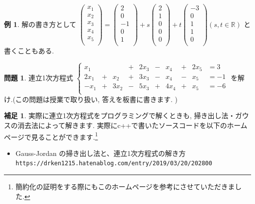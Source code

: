 \documentclass[dvipdfmx,a4paper,11pt]{article}
\newcommand{\R}{\mathbb{R}}
\theoremstyle{definition}
\newtheorem{exa}[thm]{例}
\newtheorem{rema}[thm]{補足}
\newtheorem{ques}[thm]{問題}
\begin{document}
\begin{exa}
解の書き方として
$
\begin{pmatrix}
x_1\\
x_2 \\
x_3 \\
x_4 \\
x_5 \\
\end{pmatrix}
=
\begin{pmatrix}
2\\
0 \\
-1 \\
0\\
1 \\
\end{pmatrix}
+ s
\begin{pmatrix}
2\\
1\\
0\\
0\\
0 \\
\end{pmatrix}
+ t
\begin{pmatrix}
-3\\
0\\
1\\
1\\
0 \\
\end{pmatrix}
(s, t \in \R)
$
と書くこともある.
 \end{exa}

\begin{ques}

連立1次方程式
 $
 \left\{ 
\begin{matrix}
x_1& &         &  +& 2x_3&- &x_4&+ & 2x_5&= 3 \\
2x_1&+&x_2& + &3x_3&-&x_4&-&x_5&= -1 \\
-x_1&+&3x_2& - &5x_3&+&4x_4&+&x_5&= -6 \\
\end{matrix}
\right.
 $
 を解け.(この問題は授業で取り扱い, 答えを板書に書きます. )
 \end{ques}
 
\begin{rema}
実際に連立1次方程式をプログラミングで解くときも, 掃き出し法・ガウスの消去法によって解きます. 実際にc++で書いたソースコードを以下のホームページで見ることができます.\footnote{簡約化の証明をする際にもこのホームページを参考にさせていただきました.}
\begin{itemize}
\item Gauss-Jordan の掃き出し法と、連立1次方程式の解き方 \\
 \texttt{https://drken1215.hatenablog.com/entry/2019/03/20/202800}
\end{itemize}
\end{rema}
\end{document}
